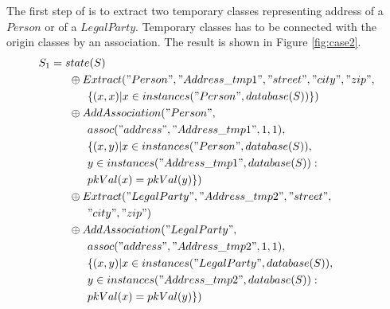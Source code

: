 \documentclass[11pt]{article}
\begin{document}
The first  step of is to extract two temporary classes representing address of a $Person$ or of a $LegalParty$. Temporary classes has to be connected with the origin classes by an association. The result is shown in Figure \ref{fig:case2}.
\begin{align*}
S_1 & = state(S) \\
& \;\;\;\;\;\; \oplus Extract("Person", "Address\_tmp1", "street", "city", "zip",\\ 
& \;\;\;\;\;\; \;\;\;\;\;\;  \{(x,x) | x \in instances("Person", database(S))\}) \\
& \;\;\;\;\;\; \oplus AddAssociation("Person", \\ 
& \;\;\;\;\;\;\;\;\;\;\;\; assoc("address", "Address\_tmp1", 1, 1),\\ 
& \;\;\;\;\;\;\;\;\;\;\;\; \{(x,y)| x \in instances("Person", database(S)), \\
& \;\;\;\;\;\; \;\;\;\;\;\; y \in instances("Address\_tmp1", database(S)) : \\ 
& \;\;\;\;\;\;\;\;\;\;\;\; pkVal(x) = pkVal(y) \}) \\
&\;\;\;\;\;\; \oplus Extract("LegalParty", "Address\_tmp2", "street", \\
& \;\;\;\;\;\;\;\;\;\;\;\; "city", "zip")  \\
& \;\;\;\;\;\; \oplus AddAssociation("LegalParty", \\ 
& \;\;\;\;\;\;\;\;\;\;\;\; assoc("address", "Address\_tmp2", 1, 1),\\ 
& \;\;\;\;\;\;\;\;\;\;\;\; \{(x,y)| x \in instances("LegalParty", database(S)), \\
& \;\;\;\;\;\;\;\;\;\;\;\; y \in instances("Address\_tmp2", database(S)) : \\
& \;\;\;\;\;\;\;\;\;\;\;\; pkVal(x) = pkVal(y) \}) \\
\end{align*}
\end{document}

